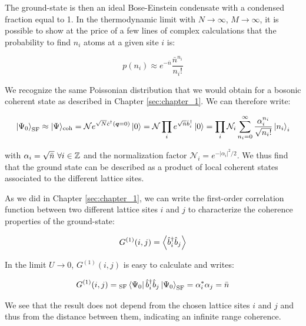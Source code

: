 \noindent The ground-state is then an ideal Bose-Einstein condensate with a condensed fraction equal to 1. In the thermodynamic limit with $N \to \infty$, $M \to \infty$, it is possible to show at the price of a few lines of complex calculations \cite{gerbier_notes} that the probability to find $n_i$ atoms at a given site $i$ is:

\begin{equation}
    p\left(n_{i}\right) \approx e^{-\bar{n}} \frac{\bar{n}^{n_{i}}}{n_{i} !}
\end{equation}

\noindent We recognize the same Poissonian distribution that we would obtain for a bosonic coherent state as described in Chapter \ref{sec:chapter_1}. We can therefore write:

\begin{equation}
    \ket{\Psi_0}_{\mathrm{SF}} \approx |\Psi\rangle_{\mathrm{coh}}=\mathcal{N} e^{\sqrt{N} \hat{c}^{\dagger}(\bm{q}=0)} \ket{0} = \mathcal{N} \prod_{i} e^{\sqrt{\bar{n}} \hat{b}_{i}^{\dagger}} \ket{0} = \prod_{i} \mathcal{N}_{i} \sum_{n_{i}=0}^{\infty} \frac{\alpha_{i}^{n_{i}}}{\sqrt{n_{i} !}}\left|n_{i}\right\rangle_{i}
    \label{eq:ground-state_superfluid}
\end{equation}

\noindent with $\alpha_i=\sqrt{\bar{n}} \ \forall i \in \mathbb{Z}$ and the normalization factor $\mathcal{N}_{i}=e^{-\left|\alpha_{i}\right|^{2} / 2}$. We thus find that the ground state can be described as a product of local coherent states associated to the different lattice sites.

As we did in Chapter \ref{sec:chapter_1}, we can write the first-order correlation function between two different lattice sites $i$ and $j$ to characterize the coherence properties of the ground-state:

\begin{equation}
    G^{(1)}(i,j)= \left\langle\hat{b}^{\dagger}_i \hat{b}_j\right\rangle
\end{equation}

\noindent In the limit $U \to 0$, $G^{(1)}(i,j)$ is easy to calculate and writes:

\begin{equation}
    G^{(1)}(i,j)= {}_{\mathrm{SF}} \bra{\Psi_0} \hat{b}^{\dagger}_i \hat{b}_j \ket{\Psi_0}_{\mathrm{SF}} = \alpha^*_i \alpha_j = \bar{n}
\end{equation}

\noindent We see that the result does not depend from the chosen lattice sites $i$ and $j$ and thus from the distance between them, indicating an infinite range coherence.


